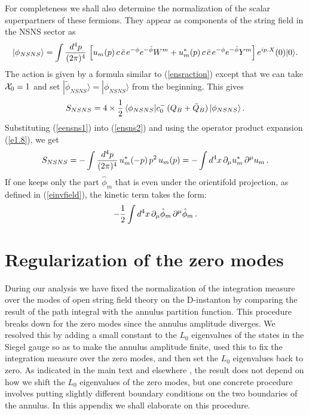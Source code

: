 \documentclass[12pt,a4paper]{article}
\newcommand{\be}{\begin{equation}}
\newcommand{\ee}{\end{equation}}
\newcommand{\refb}[1]{(\ref{#1})}
\newcommand{\p}{\partial}
\newcommand{\I}{\mathrm{i}}
\def\[{\left[}
\def\]{\right]}
\newcommand{\XX}{{\cal X}}
\def\I{i}
\def\cpi{u}
\begin{document}
For completeness we shall also determine the normalization of the scalar superpartners of
these fermions. They appear as components of the string field in the NSNS sector as
\be\label{eensns1}
|\phi_{NSNS}\rangle =
\int{d^{4}p\over (2\pi)^{4}}\, \[
\cpi_m(p) \, c\, \bar c\, e^{-\phi} e^{-\bar\phi} W^m
+ \cpi_m^*(p) \, c\, \bar c\, e^{-\phi} e^{-\bar\phi} Y^m \] e^{\I p.X}(0)|0\rangle.
\ee
The action is given by a formula similar to \refb{ensraction} except that we can take
$\XX_0=1$ and set
$|\tilde\phi_{NSNS}\rangle=|\phi_{NSNS}\rangle$ from the beginning. This gives
\be\label{ensns2}
S_{NSNS} = 4\times {1\over 2} \,  \langle
\phi_{NSNS} | c_0^- \, (Q_B+\bar Q_B)\, |\phi_{NSNS}\rangle\, .
\ee
Substituting \refb{eensns1} into \refb{ensns2} and using the operator product expansion
\refb{e1.8}, we get
\be\label{ensns3}
S_{NSNS} = -\int{d^{4}p\over (2\pi)^{4}}\,  \cpi_m^*(-p) \, p^2 \, \cpi_m(p)
= -\int d^4 x \, \p_\mu \cpi_m^* \, \p^\mu \cpi_m\, .
\ee
If one keeps only the part $\hat\phi_m$ that is even under the orientifold projection,
as defined in \refb{einvfield}, the
kinetic term takes the form:
\be\label{ensns4}
-{1\over 2} \int d^4 x \, \p_\mu \hat\phi_m \, \p^\mu \hat\phi_m\, .
\ee

\section{Regularization of the zero modes} \label{sdeform}

During our analysis we have fixed the normalization of the
integration measure over the modes of open
string field theory on the D-instanton by comparing the result of the
path integral with
the annulus partition function.
This procedure breaks down for the zero modes since the annulus amplitude
diverges. We resolved this by adding
a small constant to the $L_0$ eigenvalues of  the states in the Siegel gauge
so as to make the annulus amplitude finite, used this to fix the integration measure over
the zero modes, and then set the $L_0$ eigenvalues back to zero.
As indicated in the main
text and elsewhere \cite{Sen:2021tpp,Alexandrov:2021shf,Alexandrov:2021dyl},
the result does not depend on how we shift the $L_0$
eigenvalues of the zero modes,
but one concrete procedure involves putting slightly different boundary conditions on the two
boundaries of the annulus. In this appendix we shall elaborate on this procedure.
\end{document}
